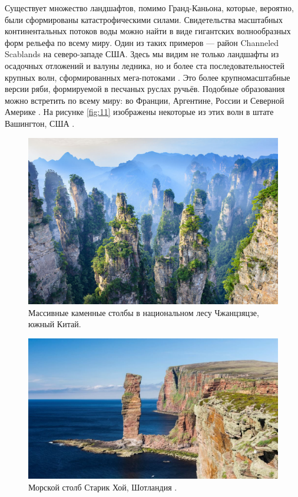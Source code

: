 \documentclass[10pt,twocolumn,letterpaper]{article}
\begin{document}
Существует множество ландшафтов, помимо Гранд-Каньона, которые, вероятно, были сформированы катастрофическими силами. Свидетельства масштабных континентальных потоков воды можно найти в виде гигантских волнообразных форм рельефа по всему миру. Один из таких примеров — район Channeled Scablands на северо-западе США. Здесь мы видим не только ландшафты из осадочных отложений и валуны ледника, но и более ста последовательностей крупных волн, сформированных мега-потоками \cite{78,79}. Это более крупномасштабные версии ряби, формируемой в песчаных руслах ручьёв. Подобные образования можно встретить по всему миру: во Франции, Аргентине, России и Северной Америке \cite{81}. На рисунке \ref{fig:11} изображены некоторые из этих волн в штате Вашингтон, США \cite{80}.
\begin{figure}[b]
\begin{center}
   \includegraphics[width=1\linewidth]{zhangjiajie.jpg}
\end{center}
   \caption{Массивные каменные столбы в национальном лесу Чжанцзяцзе, южный Китай.}
\label{fig:12}
\label{fig:onecol}
\end{figure}

\begin{figure}[b]
\begin{center}
   \includegraphics[width=1\linewidth]{hoy.jpg}
\end{center}
   \caption{Морской столб Старик Хой, Шотландия \cite{83}.}
\label{fig:13}
\label{fig:onecol}
\end{figure}
\end{document}
